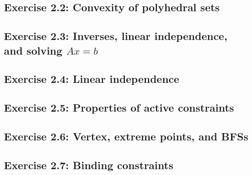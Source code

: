 \subsection*{Exercise 2.2: Convexity of polyhedral sets}


\subsection*{Exercise 2.3: Inverses, linear independence, and solving $Ax = b$} 


\subsection*{Exercise 2.4: Linear independence}


\subsection*{Exercise 2.5: Properties of active constraints}


\subsection*{Exercise 2.6: Vertex, extreme points, and BFSs}


\subsection*{Exercise 2.7: Binding constraints} 


 

